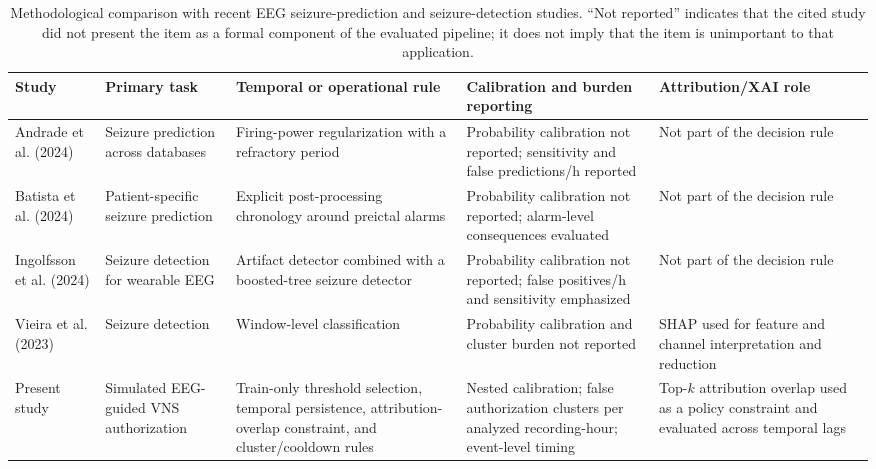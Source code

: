 \documentclass[11pt,a4paper]{article}
\begin{document}
\begin{table}[H]
\centering
\caption{Methodological comparison with recent EEG seizure-prediction and seizure-detection studies. ``Not reported'' indicates that the cited study did not present the item as a formal component of the evaluated pipeline; it does not imply that the item is unimportant to that application.}
\label{tab:related_work}
\scriptsize
\setlength{\tabcolsep}{3pt}
\renewcommand{\arraystretch}{1.18}

\begin{tabular}{@{}
>{\raggedright\arraybackslash}p{}
>{\raggedright\arraybackslash}p{}
>{\raggedright\arraybackslash}p{}
>{\raggedright\arraybackslash}p{}
>{\raggedright\arraybackslash}p{}
@{}}
\toprule
Study &
Primary task &
Temporal or operational rule &
Calibration and burden reporting &
Attribution/XAI role \\
\midrule

Andrade et al. (2024)\citep{andrade2024samplealarm} &
Seizure prediction across databases &
Firing-power regularization with a refractory period &
Probability calibration not reported; sensitivity and false predictions/h reported &
Not part of the decision rule \\

Batista et al. (2024)\citep{batista2024postprocessing} &
Patient-specific seizure prediction &
Explicit post-processing chronology around preictal alarms &
Probability calibration not reported; alarm-level consequences evaluated &
Not part of the decision rule \\

Ingolfsson et al. (2024)\citep{ingolfsson2024artifact} &
Seizure detection for wearable EEG &
Artifact detector combined with a boosted-tree seizure detector &
Probability calibration not reported; false positives/h and sensitivity emphasized &
Not part of the decision rule \\

Vieira et al. (2023)\citep{vieira2023xai} &
Seizure detection &
Window-level classification &
Probability calibration and cluster burden not reported &
SHAP used for feature and channel interpretation and reduction \\

Present study &
Simulated EEG-guided VNS authorization &
Train-only threshold selection, temporal persistence, attribution-overlap constraint, and cluster/cooldown rules &
Nested calibration; false authorization clusters per analyzed recording-hour; event-level timing &
Top-$k$ attribution overlap used as a policy constraint and evaluated across temporal lags \\

\bottomrule
\end{tabular}
\end{table}
\end{document}
